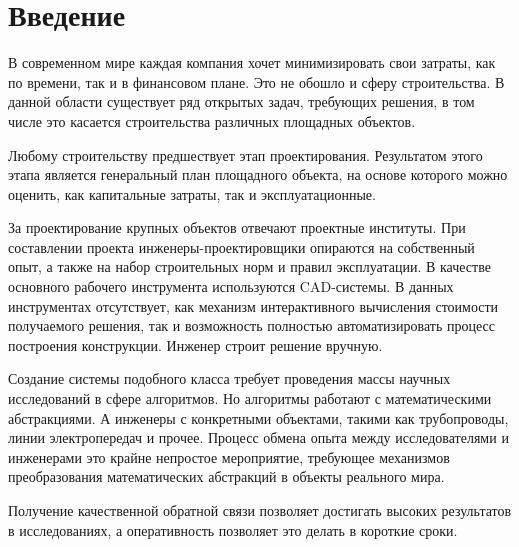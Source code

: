 \section*{\Large{Введение}}

В современном мире каждая компания хочет минимизировать свои затраты, как по времени, так и в финансовом плане.
Это не обошло и сферу строительства.
В данной области существует ряд открытых задач, требующих решения,
в том числе это касается строительства различных площадных объектов.

Любому строительству предшествует этап проектирования.
Результатом этого этапа является генеральный план площадного объекта,
на основе которого можно оценить, как капитальные затраты, так и эксплуатационные.

За проектирование крупных объектов отвечают проектные институты.
При составлении проекта инженеры-проектировщики опираются на собственный опыт, а также на набор строительных норм
и правил эксплуатации.
В качестве основного рабочего инструмента используются CAD-системы.
В данных инструментах отсутствует, как механизм интерактивного вычисления стоимости получаемого решения,
так и возможность полностью автоматизировать процесс построения конструкции. Инженер строит решение вручную.


Создание системы подобного класса требует проведения массы научных исследований в сфере алгоритмов.
Но алгоритмы работают с математическими абстракциями.
А инженеры с конкретными объектами, такими как трубопроводы, линии электропередач и прочее.
Процесс обмена опыта между исследователями и инженерами это крайне непростое мероприятие,
требующее механизмов преобразования математических абстракций в объекты реального мира.

Получение качественной обратной связи позволяет достигать высоких результатов в исследованиях, а оперативность
позволяет это делать в короткие сроки.
